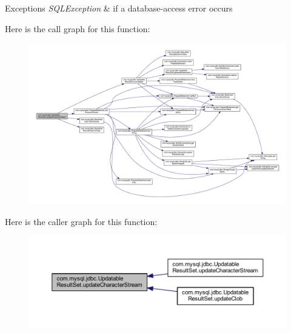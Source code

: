 \begin{DoxyExceptions}{Exceptions}
{\em S\+Q\+L\+Exception} & if a database-\/access error occurs \\
\hline
\end{DoxyExceptions}
Here is the call graph for this function\+:
\nopagebreak
\begin{figure}[H]
\begin{center}
\leavevmode
\includegraphics[width=350pt]{classcom_1_1mysql_1_1jdbc_1_1_updatable_result_set_a0ada06905919c11d57c9838b6366a7e3_cgraph}
\end{center}
\end{figure}
Here is the caller graph for this function\+:
\nopagebreak
\begin{figure}[H]
\begin{center}
\leavevmode
\includegraphics[width=350pt]{classcom_1_1mysql_1_1jdbc_1_1_updatable_result_set_a0ada06905919c11d57c9838b6366a7e3_icgraph}
\end{center}
\end{figure}
\mbox{\label{classcom_1_1mysql_1_1jdbc_1_1_updatable_result_set_aa40ad5cf67142d3dc3e3842fc16cda26}} 
